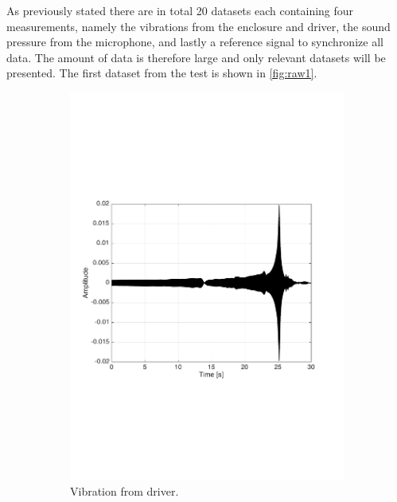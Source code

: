 As previously stated there are in total 20 datasets each containing four measurements, namely the vibrations from the enclosure and driver, the sound pressure from the microphone, and lastly a reference signal to synchronize all data. The amount of data is therefore large and only relevant datasets will be presented. The first dataset from the test is shown in \autoref{fig:raw1}.

\begin{figure}[H]
\centering
\begin{subfigure}[t]{0.335\textwidth}
	\includegraphics[width=1\textwidth]{figures/raw_driver1.pdf}
	\caption{Vibration from driver.}
	\label{fig:raw_driver1}
\end{subfigure}
\begin{subfigure}[t]{0.3\textwidth}

\end{subfigure}
\end{figure}
